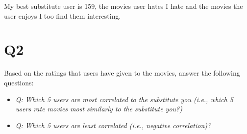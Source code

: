 \documentclass[12pt]{article}
\begin{document}
My best substitute user is 159, the movies user hates I hate and the movies the user enjoys I too find them interesting.


\section*{Q2}
Based on the ratings that users have given to the movies, answer the following questions:
\begin{itemize}
        \item \emph{Q: Which 5 users are most correlated to the substitute you (i.e., which 5 users rate movies most similarly to the substitute you?)}
        \item \emph{Q: Which 5 users are least correlated (i.e., negative correlation)?}
    \end{itemize}
\end{document}
